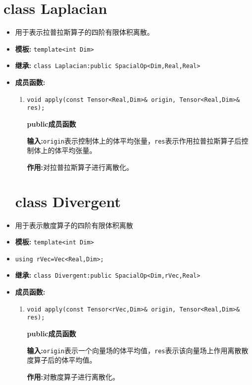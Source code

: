 \documentclass[UTF8]{ctexart}
\theoremstyle{plain}
\theoremstyle{definition}
\theoremstyle{remark}
\begin{document}
\section{class Laplacian}
\begin{itemize}
    \item 用于表示拉普拉斯算子的四阶有限体积离散。
    \item \textbf{模板:} \texttt{template<int Dim>}
    \item \textbf{继承:} \texttt{class Laplacian:public SpacialOp<Dim,Real,Real>}
    \item \textbf{成员函数:}
    \begin{enumerate}
        \item \texttt{void apply(const Tensor<Real,Dim>\& origin, Tensor<Real,Dim>\& res);}
        
        \textbf{public成员函数}

        \textbf{输入:}\texttt{origin}表示控制体上的体平均张量，\texttt{res}表示作用拉普拉斯算子后控制体上的体平均张量。

        \textbf{作用:}对拉普拉斯算子进行离散化。
    \end{enumerate}
    \section{class Divergent}
    \item 用于表示散度算子的四阶有限体积离散
    \item \textbf{模板:} \texttt{template<int Dim>}
    \item \texttt{using rVec=Vec<Real,Dim>;}
    \item \textbf{继承:} \texttt{class Divergent:public SpacialOp<Dim,rVec,Real>}
    \item \textbf{成员函数:} 
    \begin{enumerate}
        \item \texttt{void apply(const Tensor<rVec,Dim>\& origin, Tensor<Real,Dim>\& res);}
        
        \textbf{public成员函数}
        
        \textbf{输入:}\texttt{origin}表示一个向量场的体平均值，\texttt{res}表示该向量场上作用离散散度算子后的体平均值。

        \textbf{作用:}对散度算子进行离散化。
    \end{enumerate}
\end{itemize}
\end{document}
